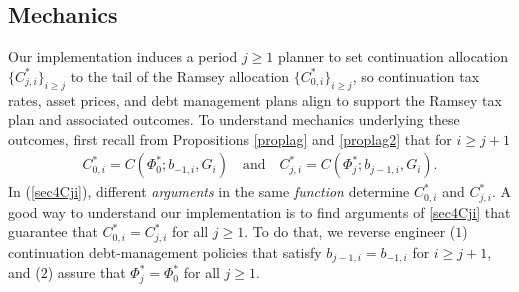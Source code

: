 \documentclass[12pt]{article}
\newcommand{\NW}[1]{{\textcolor{blue}{#1}}}
\begin{document}
\subsection{Mechanics }\label{sec:mechanics}



Our implementation  induces a  period $j\geq 1$ 
 planner to %
set continuation  allocation  $\{ C_{j, i}^*\}_{i\geq j}$ to the tail of the Ramsey allocation $\{C_{0, i}^*\}_{i\geq j}$,  so 
continuation tax rates, asset prices, and debt management plans align to support the Ramsey tax  plan and associated outcomes.  
To understand mechanics  underlying these outcomes, first recall from Propositions \ref{proplag} and \ref{proplag2} %
that for {$i\geq j+1$}
\begin{eqnarray}
C_{0, i}^*  =  C(\Phi_0^*; b_{-1, i}, G_i)   \quad \text{and} \quad  
C_{j, i}^* =  C(\Phi_j^*; b_{j-1, i}, G_i)  . \label{sec4Cji}
\end{eqnarray}
In  (\ref{sec4Cji}), different {\em arguments}    in the same {\em function} determine   $C_{0, i}^* $ and $C_{j, i}^*$. A good way to understand our implementation is to  find   arguments of  \eqref{sec4Cji} that guarantee that 
$C_{0, i}^*=C_{j, i}^* $ for all $j \geq 1$.  %
To  do  that, we reverse engineer %
($1$) continuation  debt-management policies that satisfy     $b_{j-1, i}=b_{-1, i}$  for  $i\geq j+1$, and ($2$) assure that %
$\Phi_j^*=\Phi_0^*$ for all $j \geq 1$.
\end{document}
